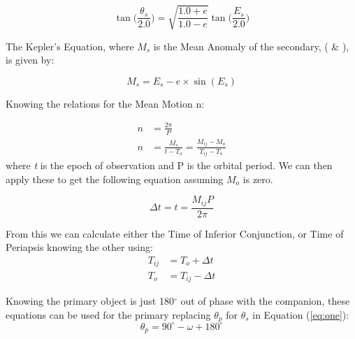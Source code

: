 \documentclass[12pt,preprint]{aastex}
\begin{document}
\begin{equation}
\tan\bigg( \frac{\theta_s}{2.0}  \bigg) = \sqrt{\frac{1.0+e}{1.0-e}} \tan\bigg( \frac{E_s}{2.0} \bigg)
\end{equation}

The Kepler's Equation, where $M_s$ is the Mean Anomaly of the secondary, (\citet{heintz} \& \citet{hilditch}), is given by:

\begin{equation}
M_s = E_s-e\times \sin(E_s)  
\end{equation}

Knowing the relations for the Mean Motion n:

\begin{subequations}
\begin{align}
n &= \frac{2\pi}{P}\\
n &=\frac{M_s}{t-T_o}=\frac{M_{ij}-M_{o}}{T_{ij}-T_o} 
\end{align}
\end{subequations}
where {\it t} is the epoch of observation and P is the orbital period.
We can then apply these to get the following equation assuming $M_{o}$ is zero.

\begin{equation}\label{eq:five}
\Delta t =t = \frac{M_{ij}P}{2\pi}
\end{equation}


From this we can calculate either the Time of Inferior Conjunction, or Time of Periapsis knowing the other using:
\begin{subequations}
\begin{align}
T_{ij} &= T_{o}+\Delta t\\
T_o &= T_{ij}-\Delta t
\end{align}
\end{subequations}



Knowing the primary object is just 180$^{\circ}$ out of phase with the companion, these equations can be used for the primary replacing $\theta_p$ for $\theta_s$ in Equation (\ref{eq:one}):
\begin{equation}
\theta_p = 90^{\circ}-\omega+180^{\circ}
\end{equation}
\end{document}

